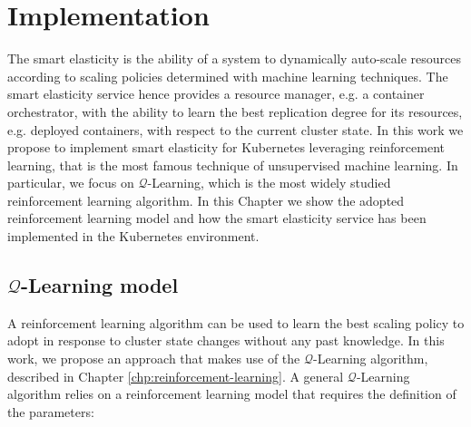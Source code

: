 \chapter{Implementation}
\label{chp:implementation}


The smart elasticity is the ability of a system to dynamically auto-scale resources according to scaling policies determined with machine learning techniques.
%
The smart elasticity service hence provides a resource manager, e.g. a container orchestrator, with the ability to learn the best replication degree for its resources, e.g. deployed containers, with respect to the current cluster state.
%
In this work we propose to implement smart elasticity for Kubernetes leveraging reinforcement learning, that is the most famous technique of unsupervised machine learning.
%
In particular, we focus on $\mathcal{Q}$-Learning, which is the most widely studied reinforcement learning algorithm.
%
In this Chapter we show the adopted reinforcement learning model and how the smart elasticity service has been implemented in the Kubernetes environment.


\section{$\mathcal{Q}$-Learning model}
\label{sec:implementation-q-learning-model}

A reinforcement learning algorithm can be used to learn the best scaling policy to adopt in response to cluster state changes without any past knowledge.
%
In this work, we propose an approach that makes use of the $\mathcal{Q}$-Learning algorithm, described in Chapter \ref{chp:reinforcement-learning}.
%
A general $\mathcal{Q}$-Learning algorithm relies on a reinforcement learning model that requires the definition of the parameters:

